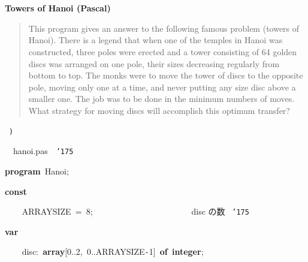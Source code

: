 \documentclass[a4paper,10pt]{article}
\def\mc{\relax}
\begin{document}
\tt\mc 

\noindent
\mbox{}\rm\mc {\tt (}{\tt *}\  \hrulefill 
\tt\mc 

\noindent
\mbox{}\rm\mc {\tt\mc \ }
\tt\mc 

\noindent
\mbox{}\rm\mc \ %

\centerline{\bf Towers of Hanoi (Pascal)}
 
\begin{quote}

This program gives an answer to the following famous problem (towers of
Hanoi).
There is a legend that when one of the temples in Hanoi was constructed,
three poles were erected and a tower consisting of 64 golden discs was
arranged on one pole, their sizes decreasing regularly from bottom to top.
The monks were to move the tower of discs to the opposite pole, moving
only one at a time, and never putting any size disc above a smaller one.
The job was to be done in the minimum numbers of moves. What strategy for
moving discs will accomplish this optimum transfer?
\end{quote}

\tt\mc 

\noindent
\mbox{}\hfill

\noindent
\mbox{}\rm\mc \hrulefill \rm\mc \ {\tt *}{\tt )}
\tt\mc 

\noindent
\mbox{}\hfill

\noindent
\mbox{}\rm\mc {\tt\char'173}\  \hrulefill\ hanoi.pas\ \hrulefill \rm\mc \ {\tt\char'175}
\tt\mc 

\noindent
\mbox{}\hfill

\noindent
\mbox{}\textbf{program}{\tt\mc \ }Hanoi;

\noindent
\mbox{}\hfill

\noindent
\mbox{}\textbf{const}

\noindent
\mbox{}{\tt\mc \ }{\tt\mc \ }{\tt\mc \ }{\tt\mc \ }ARRAYSIZE{\tt\mc \ }={\tt\mc \ }8;{\tt\mc \ }{\tt\mc \ }{\tt\mc \ }{\tt\mc \ }{\tt\mc \ }{\tt\mc \ }{\tt\mc \ }{\tt\mc \ }{\tt\mc \ }{\tt\mc \ }{\tt\mc \ }{\tt\mc \ }{\tt\mc \ }{\tt\mc \ }{\tt\mc \ }{\tt\mc \ }{\tt\mc \ }{\tt\mc \ }{\tt\mc \ }{\tt\mc \ }{\tt\mc \ }{\tt\mc \ }\rm\mc {\tt\char'173}\  disc の数 \rm\mc \ {\tt\char'175}
\tt\mc 

\noindent
\mbox{}\hfill

\noindent
\mbox{}\textbf{var}

\noindent
\mbox{}{\tt\mc \ }{\tt\mc \ }{\tt\mc \ }{\tt\mc \ }disc:{\tt\mc \ }\textbf{array}[0..2,{\tt\mc \ }0..ARRAYSIZE{\tt -}1]{\tt\mc \ }\textbf{of}{\tt\mc \ }\textbf{integer};
\end{document}
